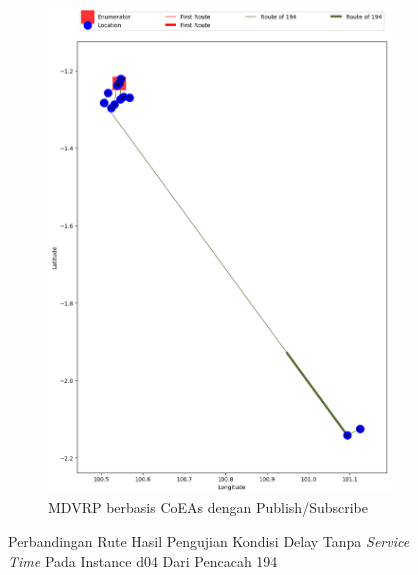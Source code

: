 \begin{figure}[H]\ContinuedFloat
	\centering
	\begin{subfigure}[t]{\textwidth}
		\centering
		\includegraphics[width=\textwidth]{Resources/Images/delayed_5/real_m15_n100_delayed_5_194_pubsub_coes}
		\caption{MDVRP berbasis CoEAs dengan Publish/Subscribe}
		\label{fig:real_m15_n100_delayed_5_194_pubsub_coes}
	\end{subfigure}
	\caption{Perbandingan Rute Hasil Pengujian Kondisi Delay Tanpa \textit{Service Time} Pada Instance d04 Dari Pencacah 194}
	\label{fig:real_m15_n100_delayed_5_194_contd}
\end{figure}


